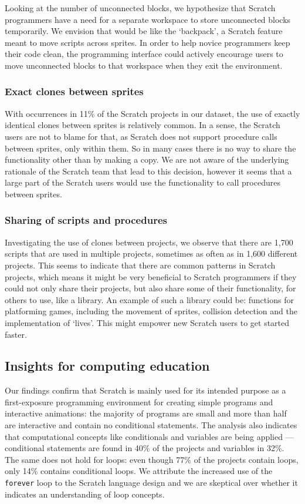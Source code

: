 \documentclass{sig-alternate-05-2015}
\begin{document}
Looking at the number of unconnected blocks, we hypothesize that Scratch programmers have a need for a separate workspace to store unconnected blocks temporarily. We envision that would be like the `backpack', a Scratch feature meant to move scripts across sprites. In order to help novice programmers keep their code clean, the programming interface could actively encourage users to move unconnected blocks to that workspace when they exit the environment.

\subsubsection{Exact clones between sprites}
\label{implicationsClones}
With occurrences in 11\% of the Scratch projects in our dataset, the use of exactly identical clones between sprites is relatively common. In a sense, the Scratch users are not to blame for that, as Scratch does not support procedure calls between sprites, only within them. So in many cases there is no way to share the functionality other than by making a copy. We are not aware of the underlying rationale of the Scratch team that lead to this decision, however it seems that a large part of the Scratch users would use the functionality to call procedures between sprites.

\subsubsection{Sharing of scripts and procedures}
Investigating the use of clones between projects, we observe that there are 1,700 scripts that are used in multiple projects, sometimes as often as in 1,600 different projects. This seems to indicate that there are common patterns in Scratch projects, which means it might be very beneficial to Scratch programmers if they could not only share their projects, but also share some of their functionality, for others to use, like a library. An example of such a library could be: functions for platforming games, including the movement of sprites, collision detection and the implementation of `lives'. This might empower new Scratch users to get started faster.

\subsection{Insights for computing education}
Our findings confirm that Scratch is mainly used for its intended purpose as a first-exposure programming environment for creating simple programs and interactive animations: the majority of programs are small and more than half are interactive and contain no conditional statements.
The analysis also indicates that computational concepts like conditionals and variables are being applied ---conditional statements are found in 40\% of the projects and variables in 32\%. The same does not hold for loops: even though 77\% of the projects contain loops, only 14\% contains conditional loops. We attribute the increased use of the \texttt{forever} loop to the Scratch language design and we are skeptical over whether it indicates an understanding of loop concepts.
\end{document}
